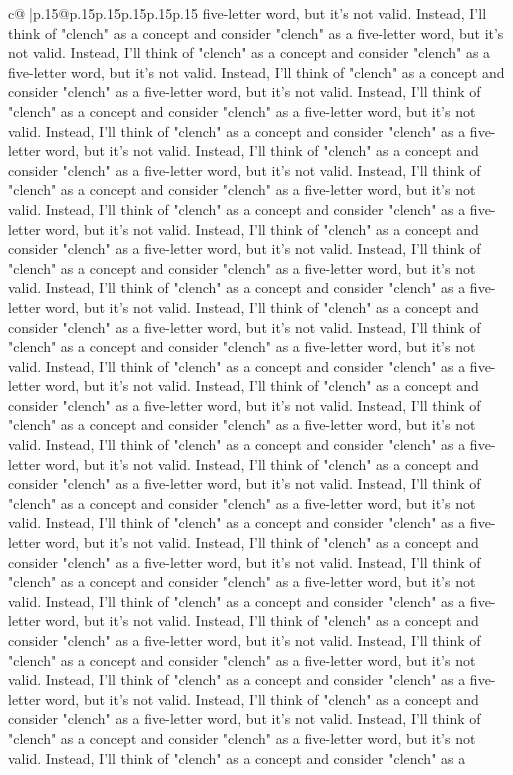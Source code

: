 \documentclass{article}
\begin{document}
{\begin{supertabular}{c@{$\;$}|p{.15\linewidth}@{}p{.15\linewidth}p{.15\linewidth}p{.15\linewidth}p{.15\linewidth}p{.15\linewidth}}
{{{five-letter word, but it's not valid. Instead, I'll think of "clench" as a concept and consider "clench" as a five-letter word, but it's not valid. Instead, I'll think of "clench" as a concept and consider "clench" as a five-letter word, but it's not valid. Instead, I'll think of "clench" as a concept and consider "clench" as a five-letter word, but it's not valid. Instead, I'll think of "clench" as a concept and consider "clench" as a five-letter word, but it's not valid. Instead, I'll think of "clench" as a concept and consider "clench" as a five-letter word, but it's not valid. Instead, I'll think of "clench" as a concept and consider "clench" as a five-letter word, but it's not valid. Instead, I'll think of "clench" as a concept and consider "clench" as a five-letter word, but it's not valid. Instead, I'll think of "clench" as a concept and consider "clench" as a five-letter word, but it's not valid. Instead, I'll think of "clench" as a concept and consider "clench" as a five-letter word, but it's not valid. Instead, I'll think of "clench" as a concept and consider "clench" as a five-letter word, but it's not valid. Instead, I'll think of "clench" as a concept and consider "clench" as a five-letter word, but it's not valid. Instead, I'll think of "clench" as a concept and consider "clench" as a five-letter word, but it's not valid. Instead, I'll think of "clench" as a concept and consider "clench" as a five-letter word, but it's not valid. Instead, I'll think of "clench" as a concept and consider "clench" as a five-letter word, but it's not valid. Instead, I'll think of "clench" as a concept and consider "clench" as a five-letter word, but it's not valid. Instead, I'll think of "clench" as a concept and consider "clench" as a five-letter word, but it's not valid. Instead, I'll think of "clench" as a concept and consider "clench" as a five-letter word, but it's not valid. Instead, I'll think of "clench" as a concept and consider "clench" as a five-letter word, but it's not valid. Instead, I'll think of "clench" as a concept and consider "clench" as a five-letter word, but it's not valid. Instead, I'll think of "clench" as a concept and consider "clench" as a five-letter word, but it's not valid. Instead, I'll think of "clench" as a concept and consider "clench" as a five-letter word, but it's not valid. Instead, I'll think of "clench" as a concept and consider "clench" as a five-letter word, but it's not valid. Instead, I'll think of "clench" as a concept and consider "clench" as a five-letter word, but it's not valid. Instead, I'll think of "clench" as a concept and consider "clench" as a five-letter word, but it's not valid. Instead, I'll think of "clench" as a concept and consider "clench" as a five-letter word, but it's not valid. Instead, I'll think of "clench" as a concept and consider "clench" as a five-letter word, but it's not valid. Instead, I'll think of "clench" as a concept and consider "clench" as a five-letter word, but it's not valid. Instead, I'll think of "clench" as a concept and consider "clench" as a five-letter word, but it's not valid. Instead, I'll think of "clench" as a concept and consider "clench" as a }}}
\end{supertabular}}
\end{document}
